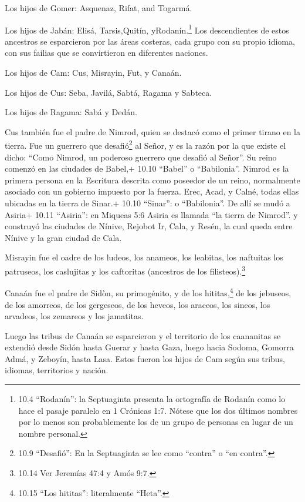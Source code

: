  Los hijos de Gomer: Asquenaz, Rifat, and Togarmá.

 Los hijos de Jabán: Elisá, Tarsis,Quitín,
yRodanín.\footnote{10.4 ``Rodanín'': la Septuaginta presenta la
  ortografía de Rodanín como lo hace el pasaje paralelo en 1 Crónicas
  1:7. Nótese que los dos últimos nombres por lo menos son probablemente
  los de un grupo de personas en lugar de un nombre personal.}
 Los descendientes de estos ancestros se esparcieron por las
áreas costeras, cada grupo con su propio idioma, con sus failias que se
convirtieron en diferentes naciones.

 Los hijos de Cam: Cus, Misrayin, Fut, y Canaán.

 Los hijos de Cus: Seba, Javilá, Sabtá, Ragama y Sabteca.

Los hijos de Ragama: Sabá y Dedán.

 Cus también fue el padre de Nimrod, quien se destacó como
el primer tirano en la tierra.  Fue un guerrero que
desafió\footnote{10.9 ``Desafió'': En la Septuaginta se lee como
  ``contra'' o ``en contra''.} al Señor, y es la razón por la que existe
el dicho: ``Como Nimrod, un poderoso guerrero que desafió al Señor''.
 Su reino comenzó en las ciudades de Babel,+ 10.10
``Babel'' o ``Babilonia''. Nimrod es la primera persona en la Escritura
descrita como poseedor de un reino, normalmente asociado con un gobierno
impuesto por la fuerza. Erec, Acad, y Calné, todas ellas ubicadas en la
tierra de Sinar.+ 10.10 ``Sinar'': o ``Babilonia''.  De
allí se mudó a Asiria+ 10.11 ``Asiria'': en Miqueas 5:6 Asiria es
llamada ``la tierra de Nimrod''. y construyó las ciudades de Nínive,
Rejobot Ir, Cala,  y Resén, la cual queda entre Nínive y la
gran ciudad de Cala.

 Misrayin fue el oadre de los ludeos, los anameos, los
leabitas, los naftuitas  los patruseos, los caslujitas y
los caftoritas (ancestros de los filisteos).\footnote{10.14 Ver Jeremías
  47:4 y Amós 9:7.}

 Canaán fue el padre de Sidòn, su primogénito, y de los
hititas,\footnote{10.15 ``Los hititas'': literalmente ``Heta''.}
 de los jebuseos, de los amorreos, de los gergeseos,
 de los heveos, los araceos, los sineos,  los
arvadeos, los zemareos y los jamatitas.

Luego las tribus de Canaán se esparcieron  y el territorio
de los caananitas se extendió desde Sidón hasta Guerar y hasta Gaza,
luego hacia Sodoma, Gomorra Admá, y Zeboyín, hasta Lasa. 
Estos fueron los hijos de Cam según sus tribus, idiomas, territorios y
nación.

